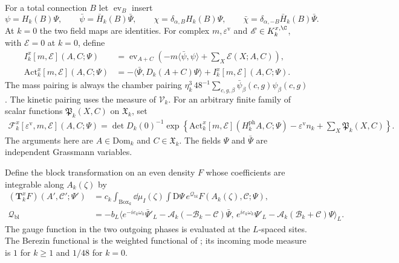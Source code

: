 For a total connection $B$ let $\operatorname{ev}_B$
insert
\[
 \psi=H_k(B)\Psi,\qquad
 \bar\psi=\bar H_k(B)\bar\Psi,\qquad
 \chi=\delta_{\alpha,B}H_k(B)\Psi,\qquad
 \bar\chi=\delta_{\alpha,-B}\bar H_k(B)\bar\Psi.
\]
At $k=0$ the two field maps are identities.
For complex $m,\varepsilon^{\mathrm v}$ and
$\mathscr E\in K_k^{x,\C}$, with $\mathscr E=0$
at $k=0$, define
\begin{equation}\label{eq:rg-step-interaction-action}
 \begin{split}
 I_k^x[m,\mathscr E](A,C;\Psi)
     &=\operatorname{ev}_{A+C}
         \left(-m\langle\bar\psi,\psi\rangle
                               +\sum_X\mathscr E(X;A,C)\right),\\
 \mathrm{Act}_k^x[m,\mathscr E](A,C;\Psi)
     &=-\langle\bar\Psi,D_k(A+C)\Psi\rangle
                                  +I_k^x[m,\mathscr E](A,C;\Psi).
 \end{split}
\end{equation}
The mass pairing is always the chamber pairing
$\eta_k^3\,48^{-1}\sum_{c,g,\beta}\bar\psi_\beta(c,g)\psi_\beta(c,g)$.
The kinetic pairing uses the measure of $\mathscr V_k$.
For an arbitrary finite family of scalar functions
$\mathfrak P_k(X,C)$ on $\mathfrak X_k$, set
\begin{equation}\label{eq:rg-step-input-density}
 \begin{split}
 \mathscr F_k^x[\varepsilon^{\mathrm v},m,\mathscr E](A,C;\Psi)
   =\det D_k(0)^{-1}\exp\left\{
         \mathrm{Act}_k^x[m,\mathscr E](H_k^{\mathrm{ph}}A,C;\Psi)
                   -\varepsilon^{\mathrm v}n_k
                              +\sum_X\mathfrak P_k(X,C)\right\}.
 \end{split}
\end{equation}
The arguments here are $A\in\mathrm{Dom}_k$ and
$C\in\mathfrak X_k$. The fields $\Psi$ and $\bar\Psi$
are independent Grassmann variables.

Define the block transformation on an even density
$F$ whose coefficients are integrable along
$A_k(\zeta)$ by
\begin{equation}\label{eq:rg-step-block-transformation}
 \begin{split}
 (\mathbf T_k^xF)(A',\mathscr C';\Psi')
  &=c_k\int_{\mathrm{Box}_k}\dd\mu_I(\zeta)
                       \int\mathrm D\Psi\,e^{\mathcal Q_{\mathrm{bl}}}
                                         F(A_k(\zeta),\mathscr C;\Psi),\\
 \mathcal Q_{\mathrm{bl}}
  &=-b_L\big\langle
       e^{-ie_k\omega_k}\bar\Psi'_L
                    -\mathcal A_k(-\mathscr B_k-\mathscr C)\bar\Psi,\,
       e^{ie_k\omega_k}\Psi'_L
                    -\mathcal A_k(\mathscr B_k+\mathscr C)\Psi
                                                \big\rangle_L.
 \end{split}
\end{equation}
The gauge function in the two outgoing phases is
evaluated at the $L$-spaced sites.
The Berezin functional is the weighted functional
of ; its incoming mode
measure is $1$ for $k\ge1$ and $1/48$ for $k=0$.

